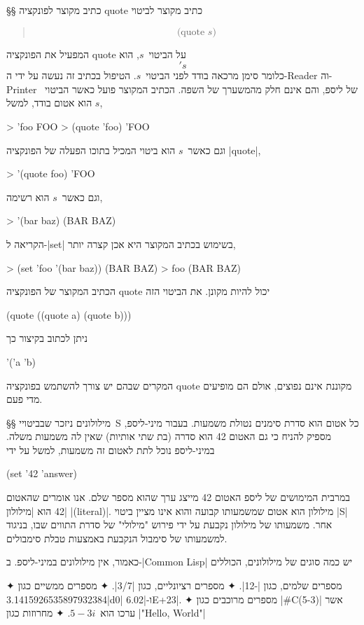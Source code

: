 §§ כתיב מקוצר לפונקציה quote
כתיב מקוצר לביטוי
\begin{quote}
  \setLTR \[
    \text{(quote~$s$)}
\] \end{quote}
המפעיל את הפונקציה quote על הביטוי~$s$, הוא \[
  's
\] כלומר סימן מרכאה בודד
לפני הביטוי~$s$. הטיפול בכתיב זה נעשה על ידי
ה-Reader וה-Printer של ליספ, והם אינם חלק מהמשערך של השפה.
הכתיב המקוצר פועל כאשר הביטוי~$s$ הוא אטום בודד, למשל,
\begin{LISP}
> 'foo
FOO
> (quote 'foo)
'FOO
\end{LISP}
וגם כאשר~$s$ הוא ביטוי המכיל בתוכו הפעלה של הפונקציה \E|quote|,
\begin{LISP}
> '(quote foo)
'FOO
\end{LISP}
וגם כאשר~$s$ הוא רשימה,
\begin{LISP}
> '(bar baz)
(BAR BAZ)
\end{LISP}
הקריאה ל-\E|set| בשימוש בכתיב המקוצר היא אכן קצרה יותר,
\begin{LISP}
> (set 'foo '(bar baz))
(BAR BAZ)
> foo
(BAR BAZ)
\end{LISP}
הכתיב המקוצר של הפונקציה quote יכול להיות מקונן. את הביטוי הזה
\begin{LISP}
(quote ((quote a) (quote b)))
\end{LISP}
ניתן לכתוב בקיצור כך
\begin{LISP}
'('a 'b)
\end{LISP}
המקרים שבהם יש צורך להשתמש בפונקציה quote מקוננת אינם נפוצים, אולם הם מופיעים מדי פעם.

§§ מילולונים
ניזכר שבביטויי~S כל אטום הוא סדרת סימנים נטולת משמעות. בעבור מיני-ליספ,
מספיק להניח כי גם האטום 42 הוא סדרה (בת שתי אותיות) שאין לה משמעות משלה.
במיני-ליספ נוכל לתת לאטום זה משמעות, למשל על ידי
\begin{LISP}
(set '42 'answer)
\end{LISP}
במרבית המימושים של ליספ האטום 42 מייצג ערך שהוא מספר
שלם. אנו אומרים שהאטום 42 הוא \ע|מילולון| \E|(literal)|. מילולון הוא
אטום שמשמעותו קבועה והוא אינו מציין ביטוי \E|S| אחר. משמעותו של מילולון
נקבעת על ידי פירוש "מילולי" של סדרת התווים שבו, בניגוד למשמעותו של סימבול
הנקבעת באמצעות טבלת סימבולים.

כאמור, אין מילולונים במיני-ליספ. ב-\E|Common Lisp| יש כמה סוגים של מילולונים,
הכוללים
\begin{enumerate}
✦ מספרים שלמים, כגון \T|-12|.
✦ מספרים רציונליים, כגון \T|3/7|.
✦ מספרים ממשיים כגון \T|3.1415926535897932384d0| ו-\T|6.02E+23|.
✦ מספרים מרוכבים כגון \T|#C(5-3)| אשר ערכו הוא~$5-3i$.
✦ מחרוזות כגון \T|"Hello, World"|
\end{enumerate}

